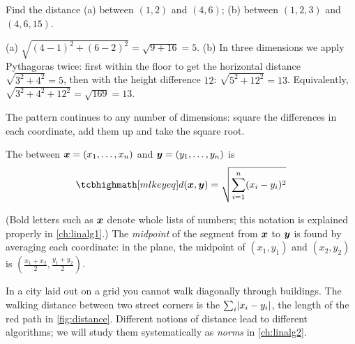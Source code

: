 \begin{example}
Find the distance (a) between $(1, 2)$ and $(4, 6)$; (b) between $(1, 2, 3)$
and $(4, 6, 15)$.

\sol (a) $\sqrt{(4-1)^2 + (6-2)^2} = \sqrt{9 + 16} = 5$.
(b) In three dimensions we apply Pythagoras twice: first within the floor to
get the horizontal distance $\sqrt{3^2 + 4^2} = 5$, then with the height
difference $12$: $\sqrt{5^2 + 12^2} = 13$. Equivalently,
$\sqrt{3^2 + 4^2 + 12^2} = \sqrt{169} = 13$.
\end{example}

The pattern continues to any number of dimensions: square the differences in
each coordinate, add them up and take the square root.

\begin{definition}\label{def:euclidean-distance}
The  between $\bm{x} = (x_1, \dots, x_n)$ and
$\bm{y} = (y_1, \dots, y_n)$ is
\[
  \keyeq{d(\vx, \vy) = \sqrt{\sum_{i=1}^{n} (x_i - y_i)^2}}
\]
\end{definition}

(Bold letters such as $\bm{x}$ denote whole lists of numbers; this notation is
explained properly in \cref{ch:linalg1}.) The \emph{midpoint} of the segment
from $\bm{x}$ to $\bm{y}$ is found by averaging each coordinate: in the plane, the
midpoint of $(x_1, y_1)$ and $(x_2, y_2)$ is
$\left(\frac{x_1 + x_2}{2}, \frac{y_1 + y_2}{2}\right)$.

\begin{remark}
In a city laid out on a grid you cannot walk diagonally through buildings. The
walking distance between two street corners is the
 $\sum_i \lvert x_i - y_i\rvert$, the length of the red path
in \cref{fig:distance}. Different notions of distance lead to different
algorithms; we will study them systematically as \emph{norms} in
\cref{ch:linalg2}.
\end{remark}

